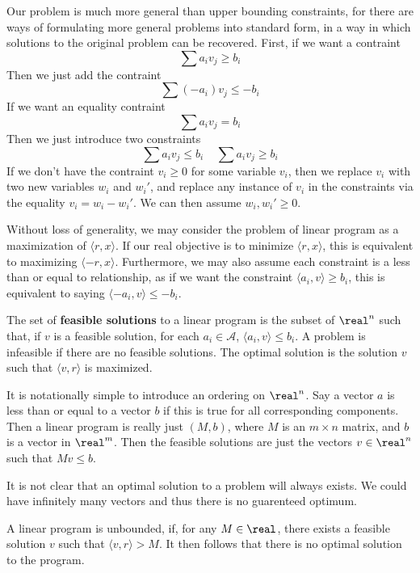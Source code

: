     Our problem is much more general than upper bounding constraints, for there are ways of formulating more general problems into standard form, in a way in which solutions to the original problem can be recovered. First, if we want a contraint
    \[ \sum a_i v_j \geq b_i \]
    Then we just add the contraint
    \[ \sum (-a_i) v_j \leq -b_i \]
    If we want an equality contraint
    \[ \sum a_i v_j = b_i \]
    Then we just introduce two constraints
    \[ \sum a_i v_j \leq b_i\ \ \ \ \ \sum a_i v_j \geq b_i \]
    If we don't have the contraint $v_i \geq 0$ for some variable $v_i$, then we replace $v_i$ with two new variables $w_i$ and $w_i'$, and replace any instance of $v_i$ in the constraints via the equality $v_i = w_i - w_i'$. We can then assume $w_i, w_i' \geq 0$.

    Without loss of generality, we may consider the problem of linear program as a maximization of $\langle r, x \rangle$. If our real objective is to minimize $\langle r, x \rangle$, this is equivalent to maximizing $\langle -r, x \rangle$. Furthermore, we may also assume each constraint is a less than or equal to relationship, as if we want the constraint $\langle a_i, v \rangle \geq b_i$, this is equivalent to saying $\langle -a_i, v \rangle \leq -b_i$.

    \begin{definition}
        The set of {\bf feasible solutions} to a linear program is the subset of $\real^n$ such that, if $v$ is a feasible solution, for each $a_i \in \mathcal{A}$, $\langle a_i, v \rangle \leq b_i$. A problem is infeasible if there are no feasible solutions. The optimal solution is the solution $v$ such that $\langle v, r \rangle$ is maximized.
    \end{definition}

    It is notationally simple to introduce an ordering on $\real^n$. Say a vector $a$ is less than or equal to a vector $b$ if this is true for all corresponding components. Then a linear program is really just $(M,b)$, where $M$ is an $m \times n$ matrix, and $b$ is a vector in $\real^m$. Then the feasible solutions are just the vectors $v \in \real^n$ such that $Mv \leq b$.

    It is not clear that an optimal solution to a problem will always exists. We could have infinitely many vectors and thus there is no guarenteed optimum.

    \begin{definition}
        A linear program is unbounded, if, for any $M \in \real$, there exists a feasible solution $v$ such that $\langle v,r \rangle > M$. It then follows that there is no optimal solution to the program.
    \end{definition}

